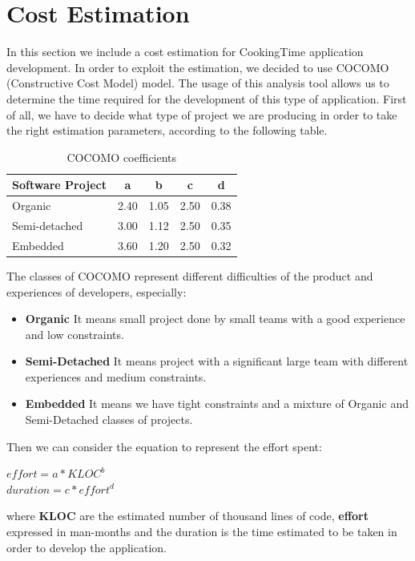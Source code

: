 \chapter{Cost Estimation}
In this section we include a cost estimation for CookingTime application development.
In order to exploit the estimation, we decided to use COCOMO (Constructive Cost Model) model.
The usage of this analysis tool allows us to determine the time required for the development of this type of application.
First of all, we have to decide what type of project we are producing in order to take the right estimation parameters, according to the following table.\\
\begin{table}[H]
	\centering
	\begin{tabular}{|l|c|c|c|c|}
	\hline
	\textbf{Software Project}& \textbf{a}& \textbf{b}& \textbf{c}& \textbf{d}\\
	\hline
	Organic & 2.40 & 1.05 & 2.50 & 0.38 \\
	\hline
	Semi-detached & 3.00 & 1.12 & 2.50 & 0.35 \\
	\hline
	Embedded & 3.60 & 1.20 & 2.50 & 0.32 \\
	\hline
	\end{tabular}
	\caption{COCOMO coefficients}
\end{table}
The classes of COCOMO represent different difficulties of the product and experiences of developers, especially:
\begin{itemize}
	\item \textbf{Organic} It means small project done by small teams with a good experience and low constraints.
	\item \textbf{Semi-Detached} It means project with a significant large team with different experiences and medium constraints.
	\item \textbf{Embedded} It means we have tight constraints and a mixture of Organic and Semi-Detached classes of projects.
\end{itemize}
Then we can consider the equation to represent the effort spent:\\
\begin{center}
$ effort = a * KLOC ^{b}$\\
$ duration = c * effort^{d}$\\
\end{center}
where \textbf{KLOC} are the estimated number of thousand lines of code, \textbf{effort} expressed in man-months and the duration is the time estimated to be taken in order to develop the application.\\
